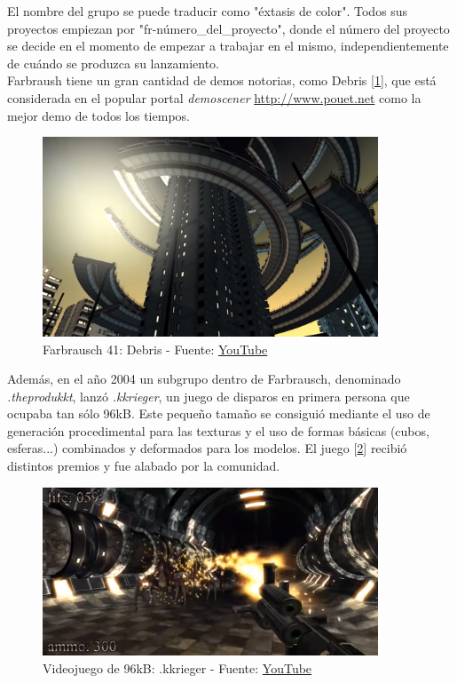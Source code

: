 El nombre del grupo se puede traducir como "éxtasis de color". Todos sus proyectos empiezan por "fr-número\_del\_proyecto", donde el número del proyecto se decide en el momento de empezar a trabajar en el mismo, independientemente de cuándo se produzca su lanzamiento.\\

Farbraush tiene un gran cantidad de demos notorias, como Debris [\ref{fig:debris}], que está considerada en el popular portal \emph{demoscener} \url{http://www.pouet.net} como la mejor demo de todos los tiempos.

\begin{figure}[h]
	\centering
	\includegraphics[width=10cm]{archivos/fr-041-debris}
	\caption{Farbrausch 41: Debris - Fuente: \href{https://www.youtube.com/watch?v=jY5Vrc5G0lk}{YouTube}}
	\label{fig:debris}
\end{figure}

Además, en el año 2004 un subgrupo dentro de Farbrausch, denominado \emph{.theprodukkt}, lanzó \emph{.kkrieger}, un juego de disparos en primera persona que ocupaba tan sólo 96kB. Este pequeño tamaño se consiguió mediante el uso de generación procedimental para las texturas y el uso de formas básicas (cubos, esferas...) combinados y deformados para los modelos. El juego [\ref{fig:kkrieger}] recibió distintos premios y fue alabado por la comunidad.\\

\begin{figure}[h]
	\centering
	\includegraphics[width=10cm]{archivos/kkrieger}
	\caption{Videojuego de 96kB: .kkrieger - Fuente: \href{https://www.youtube.com/watch?v=2NBG-sKFaB0}{YouTube}}
	\label{fig:kkrieger}
\end{figure}

